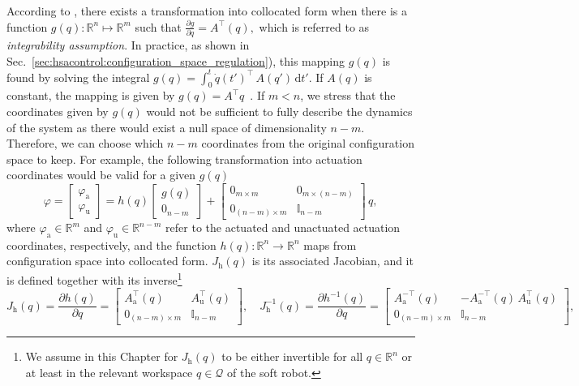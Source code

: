 According to \citet{pustina2024input}, there exists a transformation into collocated form when there is a function $g(q): \mathbb{R}^n \mapsto \mathbb{R}^m$ such that $\frac{\partial g}{\partial q} = A^\top (q),$
which is referred to as \emph{integrability assumption}. In practice, as shown in Sec.~\ref{sec:hsacontrol:configuration_space_regulation}), this mapping $g(q)$ is found by solving the integral $g(q) = \int_0^t \dot{q}(t')^\top \, A(q') \, \mathrm{d} t'$.
If $A(q)$ is constant, the mapping is given by $g(q) = A^\top q$~\citep{pustina2024input}.
If $m < n$, we stress that the coordinates given by $g(q)$ would not be sufficient to fully describe the dynamics of the system as there would exist a null space of dimensionality $n - m$. Therefore, we can choose which  $n-m$ coordinates from the original configuration space to keep. For example, the following transformation into actuation coordinates would be valid for a given $g(q)$~\citep{pustina2024input}
\begin{equation}
    \varphi = \begin{bmatrix}
        \varphi_\mathrm{a}\\ \varphi_\mathrm{u}
    \end{bmatrix} = h(q) \begin{bmatrix}
        g(q)\\ 0_{n-m}
    \end{bmatrix} + \begin{bmatrix}
        0_{m \times m} & 0_{m \times (n-m)}\\
        0_{(n-m) \times m} & \mathbb{I}_{n-m}
    \end{bmatrix} \, q,
\end{equation}
where $\varphi_\mathrm{a} \in \mathbb{R}^m$ and $\varphi_\mathrm{u} \in \mathbb{R}^{n-m}$ refer to the actuated and unactuated actuation coordinates, respectively, and the function $h(q): \mathbb{R}^{n} \to \mathbb{R}^n$ maps from configuration space into collocated form. $J_\mathrm{h}(q)$ is its associated Jacobian, and it is defined together with its inverse\footnote{We assume in this Chapter for $J_\mathrm{h}(q)$ to be either invertible for all $q \in \mathbb{R}^{n}$ or at least in the relevant workspace $q \in \mathcal{Q}$ of the soft robot.}
\begin{equation}
    J_\mathrm{h}(q) = \frac{\partial h(q)}{\partial q} = \begin{bmatrix}
        A_\mathrm{a}^\top(q) & A_\mathrm{u}^\top(q)\\
        0_{(n-m) \times m} & \mathbb{I}_{n-m}
    \end{bmatrix},
    \quad
    J_\mathrm{h}^{-1}(q) = \frac{\partial h^{-1}(q)}{\partial q} = \begin{bmatrix}
        A_\mathrm{a}^{-\top}(q) & -A_\mathrm{a}^{-\top}(q) \, A_\mathrm{u}^\top(q)\\
        0_{(n-m) \times m} & \mathbb{I}_{n-m}
    \end{bmatrix},
\end{equation}
